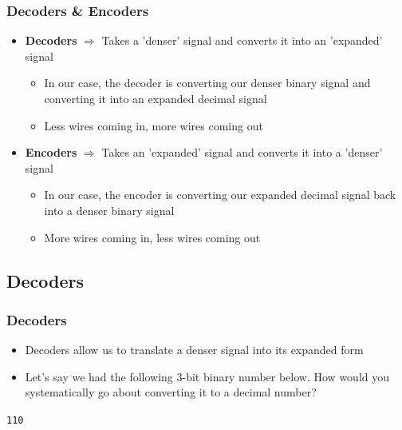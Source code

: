 \documentclass{beamer}
\begin{document}
       	\begin{frame}
       		\frametitle{Decoders \& Encoders}
       		\begin{itemize}
       			\item \textbf{Decoders} $ \Rightarrow $  Takes a 'denser' signal and converts it into an 'expanded' signal
       			\begin{itemize}
       				\item In our case, the decoder is converting our denser binary signal and converting it into an expanded decimal signal
       				\item Less wires coming in, more wires coming out \linebreak
       			\end{itemize}
       			
       			\item \textbf{Encoders} $ \Rightarrow $ Takes an 'expanded' signal and converts it into a 'denser' signal
       			\begin{itemize}
       				\item In our case, the encoder is converting our expanded decimal signal back into a denser binary signal
       				\item More wires coming in, less wires coming out
       			\end{itemize}
       			
       		\end{itemize}
       	\end{frame}
       	
		\subsection{Decoders}       	
       	
       	\begin{frame}
       		\frametitle{Decoders}
       		\begin{itemize}
       			\item Decoders allow us to translate a denser signal into its expanded form
       			\item Let's say we had the following 3-bit binary number below. How would you systematically go about converting it to a decimal number? \linebreak
       		\end{itemize}
       		
       		\centering
       		
       		{\LARGE \texttt{110}}
       	\end{frame}
       	
\end{document}
